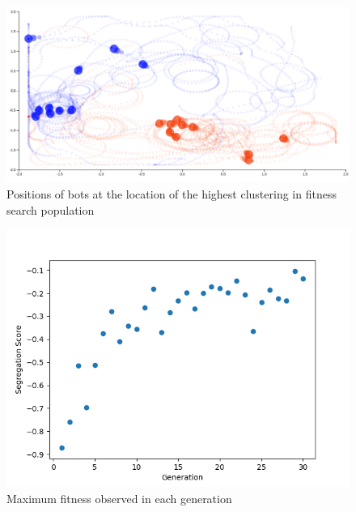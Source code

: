 \begin{figure}
    \centering
    \includegraphics[width=\linewidth]{imgs/final_place_2.png}
    \caption{Positions of bots at the location of the highest clustering in fitness search population}
    \label{fig:final_pos_2}
\end{figure}

\begin{figure}
    \centering
    \includegraphics[width=\linewidth]{imgs/fitness_search.png}
    \caption{Maximum fitness observed in each generation}
    \label{fig:fitness_search}
\end{figure}

